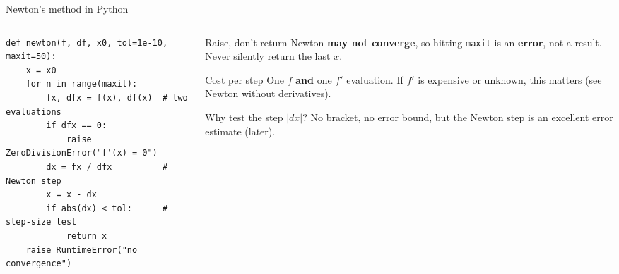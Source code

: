\documentclass[aspectratio=169]{beamer}
\begin{document}
\begin{frame}[fragile]{Newton's method in Python}
\begin{columns}[T]
\begin{column}{0.56\textwidth}
\begin{lstlisting}[basicstyle=\ttfamily\scriptsize]
def newton(f, df, x0, tol=1e-10, maxit=50):
    x = x0
    for n in range(maxit):
        fx, dfx = f(x), df(x)  # two evaluations
        if dfx == 0:
            raise ZeroDivisionError("f'(x) = 0")
        dx = fx / dfx          # Newton step
        x = x - dx
        if abs(dx) < tol:      # step-size test
            return x
    raise RuntimeError("no convergence")
\end{lstlisting}
\end{column}
\begin{column}{0.41\textwidth}
\begin{alertblock}{Raise, don't return}
\footnotesize
Newton \textbf{may not converge}, so hitting \texttt{maxit} is an \textbf{error}, not a result. Never silently return the last $x$.
\end{alertblock}
\vspace{0.05cm}
\begin{block}{Cost per step}
\footnotesize
One $f$ \textbf{and} one $f'$ evaluation. If $f'$ is expensive or unknown, this matters (see Newton without derivatives).
\end{block}
\vspace{0.05cm}
\begin{block}{Why test the step $|dx|$?}
\scriptsize No bracket, no error bound, but the Newton step is an excellent error estimate (later).
\end{block}
\end{column}
\end{columns}
\end{frame}
\end{document}
